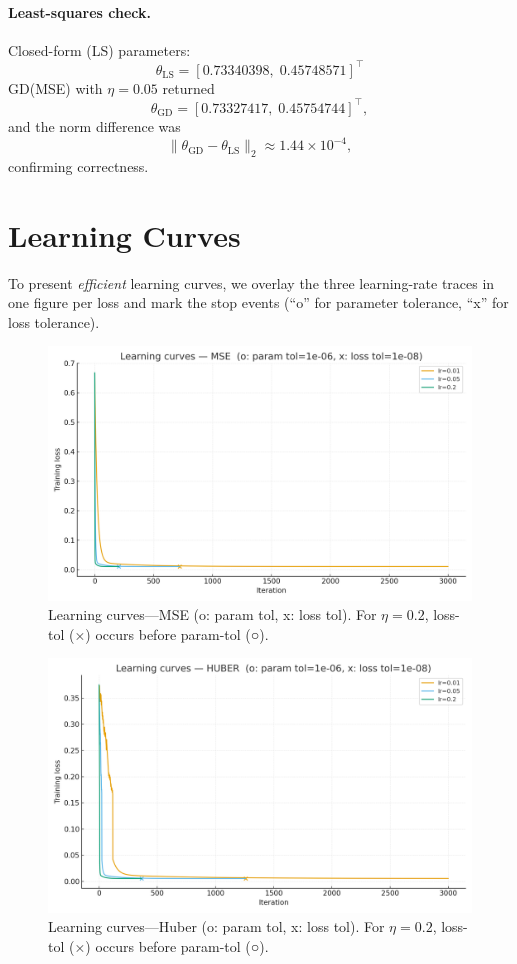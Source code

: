 \documentclass[11pt]{article}
\begin{document}
\paragraph{Least-squares check.}
Closed-form (LS) parameters:
\[
\theta_{\mathrm{LS}} = [0.73340398,\; 0.45748571]^\top
\]
GD(MSE) with $\eta=0.05$ returned
\[
\theta_{\mathrm{GD}} = [0.73327417,\; 0.45754744]^\top,
\]
and the norm difference was
\[
\|\theta_{\mathrm{GD}}-\theta_{\mathrm{LS}}\|_2 \approx 1.44\times10^{-4},
\]
confirming correctness.

\section{Learning Curves}
To present \emph{efficient} learning curves, we overlay the three learning-rate traces in one figure per loss and mark the stop events (``o'' for parameter tolerance, ``x'' for loss tolerance).

\begin{figure}[H]
\centering
\includegraphics[width=0.9\linewidth]{mse_learning_curves.png}
\caption{Learning curves---MSE \; (o: param tol, x: loss tol). For $\eta{=}0.2$, loss-tol (×) occurs before param-tol (○).}
\label{fig:mse}
\end{figure}

\begin{figure}[H]
\centering
\includegraphics[width=0.9\linewidth]{huber_learning_curves.png}
\caption{Learning curves---Huber \; (o: param tol, x: loss tol). For $\eta{=}0.2$, loss-tol (×) occurs before param-tol (○).}
\label{fig:huber}
\end{figure}
\end{document}
